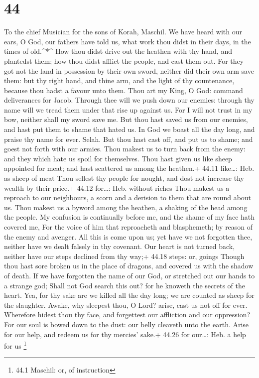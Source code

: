 \hypertarget{section-43}{%
\section{44}\label{section-43}}

To the chief Musician for the sons of Korah, Maschil.  We
have heard with our ears, O God, our fathers have told us, what work
thou didst in their days, in the times of old.\^{}*\^{}  How
thou didst drive out the heathen with thy hand, and plantedst them; how
thou didst afflict the people, and cast them out.  For they
got not the land in possession by their own sword, neither did their own
arm save them: but thy right hand, and thine arm, and the light of thy
countenance, because thou hadst a favour unto them.  Thou
art my King, O God: command deliverances for Jacob.  Through
thee will we push down our enemies: through thy name will we tread them
under that rise up against us.  For I will not trust in my
bow, neither shall my sword save me.  But thou hast saved us
from our enemies, and hast put them to shame that hated us. 
In God we boast all the day long, and praise thy name for ever. Selah.
 But thou hast cast off, and put us to shame; and goest not
forth with our armies.  Thou makest us to turn back from
the enemy: and they which hate us spoil for themselves. 
Thou hast given us like sheep appointed for meat; and hast scattered us
among the heathen.+ 44.11 like\ldots: Heb. as sheep of meat
 Thou sellest thy people for nought, and dost not increase
thy wealth by their price.+ 44.12 for\ldots: Heb. without riches
 Thou makest us a reproach to our neighbours, a scorn and a
derision to them that are round about us.  Thou makest us a
byword among the heathen, a shaking of the head among the people.
 My confusion is continually before me, and the shame of my
face hath covered me,  For the voice of him that
reproacheth and blasphemeth; by reason of the enemy and avenger.
 All this is come upon us; yet have we not forgotten thee,
neither have we dealt falsely in thy covenant.  Our heart
is not turned back, neither have our steps declined from thy way;+ 44.18
steps: or, goings  Though thou hast sore broken us in the
place of dragons, and covered us with the shadow of death. 
If we have forgotten the name of our God, or stretched out our hands to
a strange god;  Shall not God search this out? for he
knoweth the secrets of the heart.  Yea, for thy sake are we
killed all the day long; we are counted as sheep for the slaughter.
 Awake, why sleepest thou, O Lord? arise, cast us not off
for ever.  Wherefore hidest thou thy face, and forgettest
our affliction and our oppression?  For our soul is bowed
down to the dust: our belly cleaveth unto the earth.  Arise
for our help, and redeem us for thy mercies' sake.+ 44.26 for our\ldots:
Heb. a help for us \footnote{44.1 Maschil: or, of instruction}

